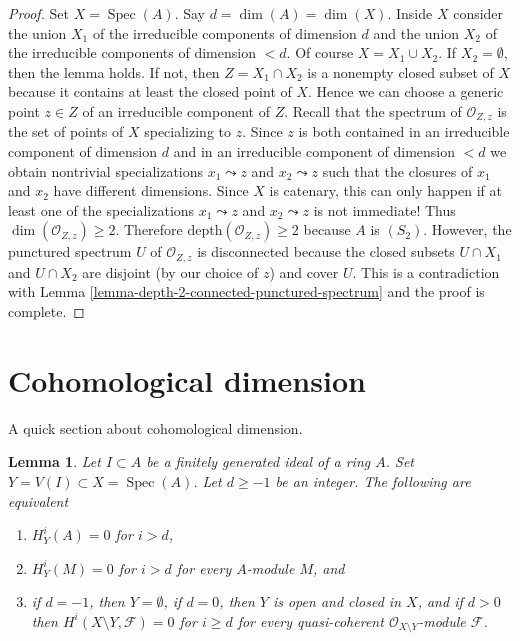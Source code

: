 \documentclass{stacks-project}
\theoremstyle{plain}
\newtheorem{lemma}[subsection]{Lemma}
\theoremstyle{definition}
\theoremstyle{remark}
\numberwithin{equation}{subsection}
\def\Spec{\mathop{\mathrm{Spec}}}
\begin{document}
\begin{proof}
Set $X = \Spec(A)$. Say $d = \dim(A) = \dim(X)$. Inside $X$ consider the
union $X_1$ of the irreducible components of dimension $d$ and the union
$X_2$ of the irreducible components of dimension $< d$. Of course
$X = X_1 \cup X_2$. If $X_2 = \emptyset$,
then the lemma holds. If not, then $Z = X_1 \cap X_2$ is a nonempty closed
subset of $X$ because it contains at least the closed point of $X$.
Hence we can choose a generic point $z \in Z$ of an irreducible component
of $Z$. Recall that the spectrum of $\mathcal{O}_{Z, z}$ is the set of points
of $X$ specializing to $z$. Since $z$ is both contained in an
irreducible component of dimension $d$ and in an irreducible component
of dimension $< d$ we obtain nontrivial specializations $x_1 \leadsto z$ and
$x_2 \leadsto z$ such that the closures of $x_1$ and $x_2$ have different
dimensions. Since $X$ is catenary, this can only happen if at least
one of the specializations $x_1 \leadsto z$ and $x_2 \leadsto z$ is not
immediate! Thus $\dim(\mathcal{O}_{Z, z}) \geq 2$. Therefore
$\text{depth}(\mathcal{O}_{Z, z}) \geq 2$ because $A$ is $(S_2)$.
However, the punctured spectrum $U$ of $\mathcal{O}_{Z, z}$ is disconnected
because the closed subsets $U \cap X_1$ and $U \cap X_2$ are disjoint
(by our choice of $z$) and cover $U$. This is a contradiction with
Lemma \ref{lemma-depth-2-connected-punctured-spectrum}
and the proof is complete.
\end{proof}



\section{Cohomological dimension}
\label{section-cd}

\noindent
A quick section about cohomological dimension.

\begin{lemma}
\label{lemma-cd}
Let $I \subset A$ be a finitely generated ideal of a ring $A$.
Set $Y = V(I) \subset X = \Spec(A)$. Let $d \geq -1$ be an integer.
The following are equivalent
\begin{enumerate}
\item $H^i_Y(A) = 0$ for $i > d$,
\item $H^i_Y(M) = 0$ for $i > d$ for every $A$-module $M$, and
\item if $d = -1$, then $Y = \emptyset$, if $d = 0$, then
$Y$ is open and closed in $X$, and if $d > 0$ then
$H^i(X \setminus Y, \mathcal{F}) = 0$ for $i \geq d$
for every quasi-coherent $\mathcal{O}_{X \setminus Y}$-module $\mathcal{F}$.
\end{enumerate}
\end{lemma}
\end{document}
